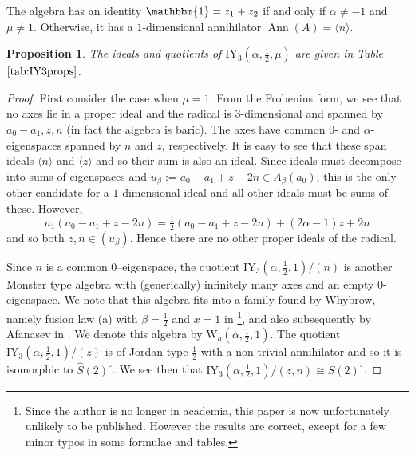 \documentclass[11pt, a4paper]{article}
\theoremstyle{plain}
\newtheorem{proposition}[theorem]{Proposition}
\theoremstyle{definition}
\newcommand\al{\alpha}
\newcommand\bt{\beta}
\newcommand\la{\langle}
\newcommand\ra{\rangle}
\DeclareMathOperator{\Ann}{Ann}
\newcommand{\IY}{\mathrm{IY}}
\newcommand{\Cl}{\widehat{S}(2)^\circ} %
\newcommand{\0}{\overline{0}}
\newcommand{\2}{\overline{2}}
\newcommand{\1}{\mathbbm{1}}
\begin{document}
The algebra has an identity $\1 = z_1 + z_2$ if and only if $\al \neq -1$ and $\mu \neq 1$.  Otherwise, it has a $1$-dimensional annihilator $\Ann(A) = \la n \ra$.

\begin{proposition}
The ideals and quotients of $\IY_3(\al, \frac{1}{2}, \mu)$ are given in Table $\ref{tab:IY3props}$.
\end{proposition}
\begin{proof}
First consider the case when $\mu = 1$.  From the Frobenius form, we see that no axes lie in a proper ideal and the radical is $3$-dimensional and spanned by $a_0-a_1, z, n$ (in fact the algebra is baric).  The axes have common $0$- and $\al$-eigenspaces spanned by $n$ and $z$, respectively.  It is easy to see that these span ideals $\la n \ra$ and $\la z \ra$ and so their sum is also an ideal.  Since ideals must decompose into sums of eigenspaces and $u_\bt := a_0-a_1 + z -2n \in A_\bt(a_0)$, this is the only other candidate for a $1$-dimensional ideal and all other ideals must be sums of these.  However, 
\[
a_1(a_0-a_1 + z -2n) = \tfrac{1}{2}(a_0-a_1 + z -2n) + (2\al-1)z + 2n
\]
and so both $z, n \in (u_\bt)$.  Hence there are no other proper ideals of the radical.

Since $n$ is a common $0$--eigenspace, the quotient $\IY_3(\al, \frac{1}{2}, 1)/(n)$ is another Monster type algebra with (generically) infinitely many axes and an empty $0$-eigenspace.  We note that this algebra fits into a family found by Whybrow, namely fusion law (a) with $\bt=\frac{1}{2}$ and $x=1$ in \cite[Theorem 5.6]{whybrowgraded}\footnote{Since the author is no longer in academia, this paper is now unfortunately unlikely to be published.  However the results are correct, except for a few minor typos in some formulae and tables.}, and also subsequently by Afanasev in \cite{axial3evals}.  We denote this algebra by $\mathrm{W}_a(\al, \frac{1}{2}, 1)$.  The quotient $\IY_3(\al, \frac{1}{2}, 1)/(z)$ is of Jordan type $\frac{1}{2}$ with a non-trivial annihilator and so it is isomorphic to $\Cl$.  We see then that $\IY_3(\al, \frac{1}{2}, 1)/(z,n) \cong S(2)^\circ$.


\end{proof}
\end{document}
